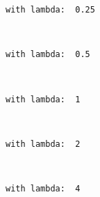 \documentclass[11pt]{article}
\begin{document}
    \begin{Verbatim}[commandchars=\\\{\}]
     with lambda:  0.25

    \end{Verbatim}

    \begin{center}
    \end{center}
    { \hspace*{\fill} \\}
    
    \begin{Verbatim}[commandchars=\\\{\}]
     with lambda:  0.5

    \end{Verbatim}

    \begin{center}
    \end{center}
    { \hspace*{\fill} \\}
    
    \begin{Verbatim}[commandchars=\\\{\}]
     with lambda:  1

    \end{Verbatim}

    \begin{center}
    \end{center}
    { \hspace*{\fill} \\}
    
    \begin{Verbatim}[commandchars=\\\{\}]
     with lambda:  2

    \end{Verbatim}

    \begin{center}
    \end{center}
    { \hspace*{\fill} \\}
    
    \begin{Verbatim}[commandchars=\\\{\}]
     with lambda:  4

    \end{Verbatim}
\end{document}
